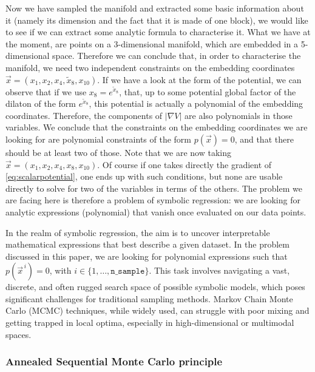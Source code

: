 \documentclass[11pt]{article}
\begin{document}
		Now we have sampled the manifold and extracted some basic information about it (namely its dimension and the fact that it is made of one block), we would like to see if we can extract some analytic formula to characterise it. What we have at the moment, are points on a 3-dimensional manifold, which are embedded in a 5-dimensional space. Therefore we can conclude that, in order to characterise the manifold, we need two independent constraints on the embedding coordinates $\vec{x} = (x_1,x_2,x_4,\tilde{x}_8,x_{10})$. If we have a look at the form of the potential, we can observe that if we use $x_{8} = e^{\tilde{x}_8}$, that, up to some potential global factor of the dilaton of the form $e^{\tilde{x}_8}$, this potential is actually a polynomial of the embedding coordinates. Therefore, the components of $|\nabla V|$ are also polynomials in those variables. We conclude that the constraints on the embedding coordinates we are looking for are polynomial constraints of the form $p(\vec{x}) = 0$, and that there should be at least two of those. Note that we are now taking $\vec{x} = (x_1,x_2,x_4,x_8,x_{10})$. Of course if one takes directly the gradient of \eqref{eq:scalarpotential}, one ends up with such conditions, but none are usable directly to solve for two of the variables in terms of the others. The problem we are facing here is therefore a problem of symbolic regression: we are looking for analytic expressions (polynomial) that vanish once evaluated on our data points. 

		
		In the realm of symbolic regression, the aim is to uncover interpretable mathematical expressions that best describe a given dataset. In the problem discussed in this paper, we are looking for polynomial expressions such that $p(\vec{x}^{\,i}) = 0$, with $i \in \{1, \dots, \texttt{n\_{sample}}\}$. This task involves navigating a vast, discrete, and often rugged search space of possible symbolic models, which poses significant challenges for traditional sampling methods. Markov Chain Monte Carlo (MCMC) techniques, while widely used, can struggle with poor mixing and getting trapped in local optima, especially in high-dimensional or multimodal spaces.
		
		\subsubsection{Annealed Sequential Monte Carlo principle}
		
\end{document}
